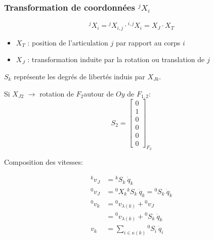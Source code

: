 \documentclass[10pt]{beamer}
\begin{document}
\begin{frame}[allowframebreaks]
  \frametitle{Transformation de coordonnées $^jX_i$} \hyperlink{ch_optimisations}{}
  \hypertarget{app_algSpat2}{}
  
  
  \framebreak
  
  \begin{block}{}
  \begin{equation*}
  ^jX_i = {^jX_{i,j}} \cdot {^{i,j}X_i} = X_J \cdot X_T
  \end{equation*}
  
  \begin{itemize}
  \item $X_T$ : position de l'articulation $j$ par rapport au corps $i$
  \item $X_J$ : transformation induite par la rotation ou translation de $j$
  \end{itemize}
  \end{block}
  
  \bigskip
  $S_k$ représente les degrés de libertés induis par $X_{Jk}$.
  
  Si $X_{J2}$ $\rightarrow$ rotation de $F_2 $autour de $Oy$ de $F_{1,2}$:
  \begin{equation*}
  S_2 = \begin{bmatrix}
  0 \\ 1 \\ 0 \\ 0 \\ 0 \\ 0
  \end{bmatrix}_{F_2}
  \end{equation*}
  
  \framebreak
  
  Composition des vitesses:
  
	\begin{align*}
	{^kv_J} &= {^kS_k} \: \dot{q}_k \\
	{^0v_J} &= {^0X_k} {^kS_k} \: \dot{q}_k = {^0S_k} \: \dot{q}_k \\
	{^0v_k} &= {^0v_{\lambda(k)}} + {^0v_{J}} \\
	&= {^0v_{\lambda(k)}} + {^0S_k} \: \dot{q}_k \\
	 v_k &= \sum_{i \in \kappa(k)} {^0S_i} \: \dot{q}_i
	\end{align*}
    
\end{frame}
\end{document}
